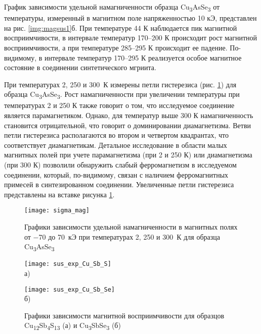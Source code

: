 График зависимости удельной намагниченности образца Cu\textsubscript{3}AsSe\textsubscript{3} от температуры, измеренный в магнитном поле напряженностью 10 кЭ, представлен на рис. \ref{img:magsus1}б.
При температуре 44 К наблюдается пик магнитной восприимчивости, в интервале температур 170--200 К происходит рост магнитной восприимчивости, а при температуре 285--295 К происходит ее падение. 
По-видимому, в интервале температур 170--295 К реализуется особое магнитное состояние в соединении синтетического мгриита.

При температурах 2, 250 и 300~К измерены петли гистерезиса (рис. \ref{img:magsus3}) для образца Cu\textsubscript{3}AsSe\textsubscript{3}.
Рост намагниченности при увеличении температуры при температурах 2 и 250 К также говорит о
том, что исследуемое соединение является парамагнетиком. 
Однако, для температур выше 300 К намагниченность становится отрицательной, что
говорит о доминировании диамагнетизма.
 Ветви петли гистерезиса располагаются во втором и четвертом квадрантах, что соответствует диамагнетикам. 
Детальное исследование в области малых магнитных полей при учете парамагнетизма (при 2 и 250 К) или диамагнетизма (при 300 К) позволили обнаружить слабый ферромагнетизм в исследуемом соединении, который, по-видимому, связан с наличием ферромагнитных примесей в синтезированном соединении.
Увеличенные петли гистерезиса представлены на вставке рисунка \ref{img:magsus3}.



\begin{figure}[pt!]
  \begin{minipage}[ht]{0.9\linewidth}\centering
    \texttt{[image: sigma\_mag]} \\ 
  \end{minipage}

      \caption[Графики зависимости удельной намагниченности в магнитных полях от $-$70 до 70~кЭ при температурах 2, 250 и 300~К для образца Cu\textsubscript{3}AsSe\textsubscript{3}]{Графики зависимости удельной намагниченности в магнитных полях от $-$70 до 70~кЭ при температурах 2, 250 и 300~К для образца Cu\textsubscript{3}AsSe\textsubscript{3}}
    \label{img:magsus3}
\end{figure}


\begin{figure}[pt!]
  \begin{minipage}[ht]{0.9\linewidth}\centering
    \texttt{[image: sus\_exp\_Cu\_Sb\_S]} \\ а)
  \end{minipage}
\vfill
  \begin{minipage}[ht]{0.9\linewidth}\centering
    \texttt{[image: sus\_exp\_Cu\_Sb\_Se]} \\ б)
  \end{minipage}
      \caption[Графики зависимости магнитной восприимчивости для образцов Cu\textsubscript{12}Sb\textsubscript{4}S\textsubscript{13} (а) и Cu\textsubscript{3}SbSe\textsubscript{3} (б)]{Графики зависимости магнитной восприимчивости для образцов Cu\textsubscript{12}Sb\textsubscript{4}S\textsubscript{13} (а) и Cu\textsubscript{3}SbSe\textsubscript{3} (б)}
    \label{img:magsus2}
\end{figure}

